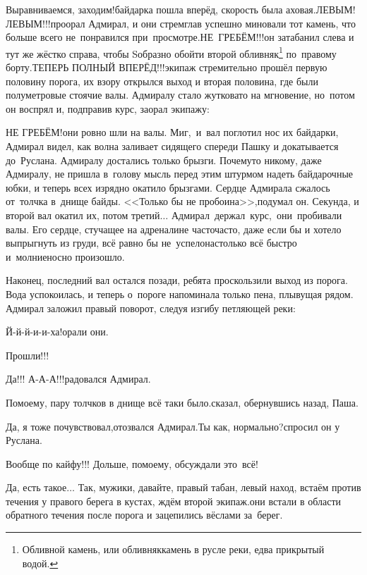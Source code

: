 \renewcommand*{\thefootnote}{\fnsymbol{footnote}}
\setcounter{footnote}{0}
\diagdash Выравниваемся, заходим!\mdash байдарка пошла вперёд, скорость была аховая.\mdash ЛЕВЫМ! ЛЕВЫМ!!!\mdash проорал Адмирал, и они стремглав успешно миновали тот камень, что больше всего не~понравился при~просмотре.\mdash НЕ~ГРЕБЁМ!!!\mdash он затабанил слева и тут же жёстко справа, чтобы S\sdash образно обойти второй обливняк\footnote{Обливной камень, или обливняк\mdash камень в русле реки, едва прикрытый водой.} по~правому борту.\mdash ТЕПЕРЬ ПОЛНЫЙ ВПЕРЁД!!!\mdash экипаж стремительно прошёл первую половину порога, их взору открылся выход и вторая половина, где были полуметровые стоячие валы. Адмиралу стало жутковато на мгновение, но~потом он воспрял и, подправив курс, заорал экипажу:

\diagdash НЕ ГРЕБЁМ!\mdash они ровно шли на валы. Миг,~и~вал поглотил нос их байдарки, Адмирал видел, как волна заливает сидящего спереди Пашку и докатывается до~Руслана. Адмиралу достались только брызги. Почему\sdash то никому, даже Адмиралу, не пришла в~голову мысль перед этим штурмом надеть байдарочные юбки, и теперь всех изрядно окатило брызгами. Сердце Адмирала сжалось от~толчка в~днище байды. <<Только бы не пробоина>>,\mdash подумал он. Секунда, и второй вал окатил их, потом третий$\ldots$ Адмирал~держал~курс,~они~пробивали валы. Его сердце, стучащее на адреналине часто\sdash часто, даже если бы и хотело выпрыгнуть из груди, всё равно бы не~успело\mdash настолько всё быстро и~молниеносно произошло. 

Наконец, последний вал остался позади, ребята проскользили выход из порога. Вода успокоилась, и теперь о~пороге напоминала только пена, плывущая рядом. Адмирал заложил правый поворот, следуя изгибу петляющей реки:

\diagdash Й-й-й-и-и-ха!\mdash орали они.

\diagdash Прошли!!!

\diagdash Да!!! А-А-А!!!\mdash радовался Адмирал.

\diagdash По\sdash моему, пару толчков в днище всё таки было.\mdash сказал, обернувшись назад, Паша. 

\diagdash Да, я тоже почувствовал,\mdash отозвался Адмирал.\mdash Ты как, нормально?\mdash спросил он у Руслана.

\diagdash Вообще по кайфу!!! Дольше, по\sdash моему, обсуждали это~всё!

\diagdash Да, есть такое$\ldots$ Так, мужики, давайте, правый табан, левый наход, встаём против течения у правого берега в кустах, ждём второй экипаж.\mdash они встали в области обратного течения после порога и зацепились вёслами за~берег.

